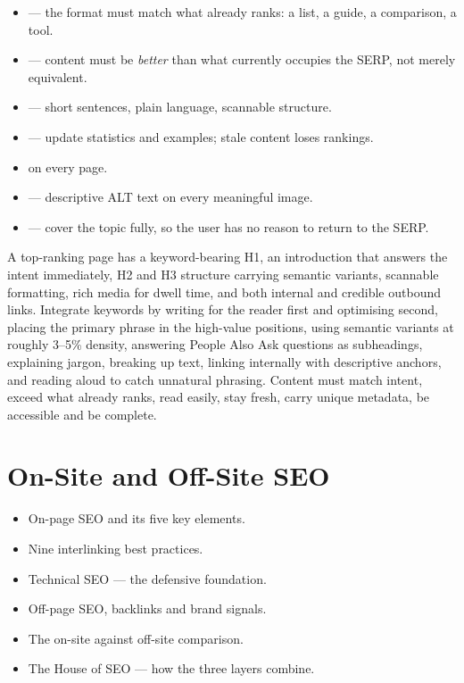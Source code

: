 \begin{itemize}
\item {} --- the format must match what already ranks: a
      list, a guide, a comparison, a tool.
\item {} --- content must be \emph{better} than what
      currently occupies the SERP, not merely equivalent.
\item {} --- short sentences, plain language, scannable structure.
\item {} --- update statistics and examples; stale content loses
      rankings.
\item {} on every page.
\item {} --- descriptive ALT text on every meaningful image.
\item {} --- cover the topic fully, so the user has no
      reason to return to the SERP.
\end{itemize}

\begin{summarybox}
A top-ranking page has a keyword-bearing H1, an introduction that answers the
intent immediately, H2 and H3 structure carrying semantic variants, scannable
formatting, rich media for dwell time, and both internal and credible outbound
links. Integrate keywords by writing for the reader first and optimising second,
placing the primary phrase in the high-value positions, using semantic variants
at roughly 3--5\% density, answering People Also Ask questions as subheadings,
explaining jargon, breaking up text, linking internally with descriptive anchors,
and reading aloud to catch unnatural phrasing. Content must match intent, exceed
what already ranks, read easily, stay fresh, carry unique metadata, be accessible
and be complete.
\end{summarybox}

\chapter{On-Site and Off-Site SEO}


\begin{learningoutcomes}
\begin{itemize}
\item On-page SEO and its five key elements.
\item Nine interlinking best practices.
\item Technical SEO --- the defensive foundation.
\item Off-page SEO, backlinks and brand signals.
\item The on-site against off-site comparison.
\item The House of SEO --- how the three layers combine.
\end{itemize}
\end{learningoutcomes}

